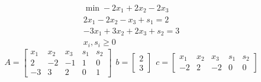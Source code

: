 \Es
\begin{gather*}
\min -2x_{1} +2x_{2} -2x_{3}\\
2x_{1} -2x_{2} -x_{3} +s_{1} =2\\
-3x_{1} +3x_{2} +2x_{3} +s_{2} =3\\
x_{i} ,s_{i} \geq 0
\end{gather*}
\begin{equation*}
A=\begin{bmatrix}
x_{1} & x_{2} & x_{3} & s_{1} & s_{2}\\
2 & -2 & -1 & 1 & 0\\
-3 & 3 & 2 & 0 & 1
\end{bmatrix} \ \ b=\begin{bmatrix}
2\\
3
\end{bmatrix} \ \ c=\begin{bmatrix}
x_{1} & x_{2} & x_{3} & s_{1} & s_{2}\\
-2 & 2 & -2 & 0 & 0
\end{bmatrix}
\end{equation*}

